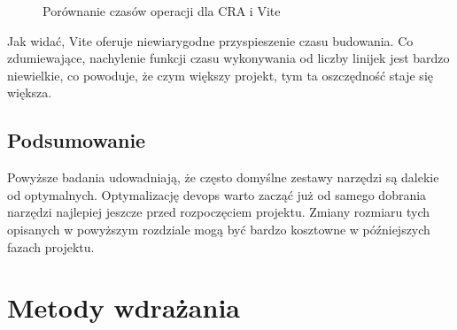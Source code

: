 \documentclass{article}
\begin{document}
\begin{figure}[H]
\centering
{}
\caption{Porównanie czasów operacji dla CRA i Vite}
\label{fig:cra_vs_vite}
\end{figure}

Jak widać, Vite oferuje niewiarygodne przyspieszenie czasu budowania. Co zdumiewające, nachylenie funkcji czasu wykonywania od liczby linijek jest bardzo niewielkie, co powoduje, że czym większy projekt, tym ta oszczędność staje się większa.

\subsection{Podsumowanie}

Powyższe badania udowadniają, że często domyślne zestawy narzędzi są dalekie od optymalnych. Optymalizację devops warto zacząć już od samego dobrania narzędzi najlepiej jeszcze przed rozpoczęciem projektu. Zmiany rozmiaru tych opisanych w powyższym rozdziale mogą być bardzo kosztowne w późniejszych fazach projektu.

\section{Metody wdrażania}
\end{document}
